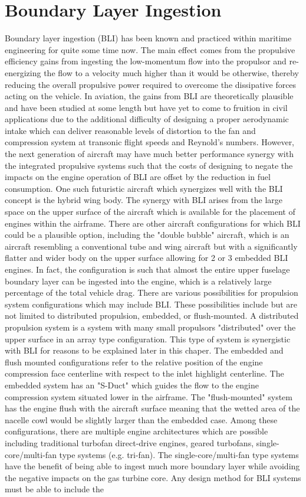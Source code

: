 \documentclass[12pt]{gatech-thesis}
\begin{document}
\section{Boundary Layer Ingestion}
Boundary layer ingestion (BLI) has been known and practiced within maritime engineering for quite some time now. The main effect comes from the propulsive efficiency gains from ingesting the low-momentum flow into the propulsor and re-energizing the flow to a velocity much higher than it would be otherwise, thereby reducing the overall propulsive power required to overcome the dissipative forces acting on the vehicle. In aviation, the gains from BLI are theoretically plausible and have been studied at some length but have yet to come to fruition in civil applications due to the additional difficulty of designing a proper aerodynamic intake which can deliver reasonable levels of distortion to the fan and compression system at transonic flight speeds and Reynold's numbers. However, the next generation of aircraft may have much better performance synergy with the integrated propulsive systems such that the costs of designing to negate the impacts on the engine operation of BLI are offset by the reduction in fuel consumption. One such futuristic aircraft which synergizes well with the BLI concept is the hybrid wing body. The synergy with BLI arises from the large space on the upper surface of the aircraft which is available for the placement of engines within the airframe. There are other aircraft configurations for which BLI could be a plausible option, including the "double bubble" aircraft, which is an aircraft resembling a conventional tube and wing aircraft but with a significantly flatter and wider body on the upper surface allowing for 2 or 3 embedded BLI engines. In fact, the configuration is such that almost the entire upper fuselage boundary layer can be ingested into the engine, which is a relatively large percentage of the total vehicle drag.  There are various possibilities for propulsion system configurations which may include BLI. These possibilities include but are not limited to distributed propulsion, embedded, or flush-mounted. A distributed propulsion system is a system with many small propulsors "distributed" over the upper surface in an array type configuration.  This type of system is synergistic with BLI for reasons to be explained later in this chaper. The embedded and flush mounted configurations refer to the relative position of the engine compression face centerline with respect to the inlet highlight centerline. The embedded system has an "S-Duct" which guides the flow to the engine compression system situated lower in the airframe. The "flush-mounted" system has the engine flush with the aircraft surface meaning that the wetted area of the nacelle cowl would be slightly larger than the embedded case.  Among these configurations, there are multiple engine architectures which are possible including traditional turbofan direct-drive engines, geared turbofans, single-core/multi-fan type systems (e.g. tri-fan).  The single-core/multi-fan type systems have the benefit of being able to ingest much more boundary layer while avoiding the negative impacts on the gas turbine core.  Any design method for BLI systems must be able to include the 
\end{document}
